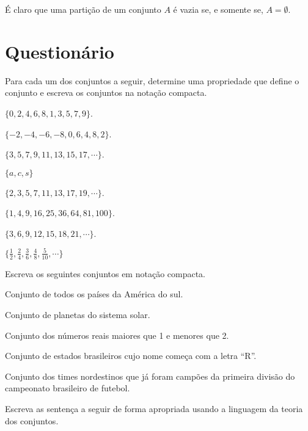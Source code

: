 \begin{remark}
	É claro que uma partição de um conjunto $A$ é vazia se, e somente se, $A = \emptyset$.
\end{remark}

\section{Questionário}\label{sec:Questionario1part1}

\begin{problem}\label{prob:Conjuntos1}
	Para cada um dos conjuntos a seguir, determine uma propriedade que define o conjunto e escreva os conjuntos na notação compacta.
\end{problem}

\begin{exerList}
	\item $\{0,2,4,6,8,1,3,5,7,9\}$.
	\item $\{-2, -4, -6, -8, 0, 6, 4, 8, 2\}$.
	\item $\{3, 5, 7, 9, 11, 13, 15, 17, \cdots\}$.
	\item $\{a, c, s\}$
	\item $\{2, 3, 5, 7, 11, 13, 17, 19, \cdots\}$.
	\item $\{1, 4, 9, 16, 25, 36, 64, 81, 100\}$.
	\item $\{3, 6, 9, 12, 15, 18, 21, \cdots\}$.
	\item $\{\frac{1}{2}, \frac{2}{4}, \frac{3}{6}, \frac{4}{8}, \frac{5}{10}, \cdots\}$
\end{exerList}

\begin{problem}\label{prob:Conjuntos2}
	Escreva os seguintes conjuntos em notação compacta.
\end{problem}

\begin{exerList}
	\item Conjunto de todos os países da América do sul.
	\item Conjunto de planetas do sistema solar.
	\item Conjunto dos números reais maiores que 1 e menores que 2.
	\item Conjunto de estados brasileiros cujo nome começa com a letra ``R''.
	\item Conjunto dos times nordestinos que já foram campões da primeira divisão do campeonato brasileiro de futebol.
\end{exerList}

\begin{problem}\label{prob:Conjuntos3}
	Escreva as sentença a seguir de forma apropriada usando a linguagem da teoria dos conjuntos.
\end{problem}

